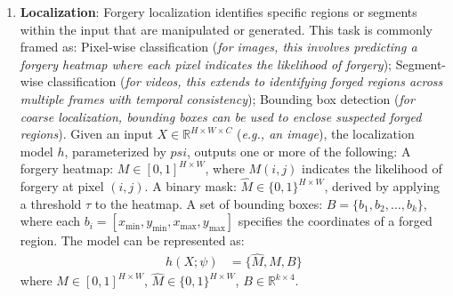 \begin{enumerate}
    \item \textbf{Localization}:
    Forgery localization identifies specific regions or segments within the input that are manipulated or generated. This task is commonly framed as: Pixel-wise classification (\textit{for images, this involves predicting a forgery heatmap where each pixel indicates the likelihood of forgery}); Segment-wise classification (\textit{for videos, this extends to identifying forged regions across multiple frames with temporal consistency}); Bounding box detection (\textit{for coarse localization, bounding boxes can be used to enclose suspected forged regions}). Given an input $X\in \mathbb{R}^{H \times W \times C}$ (\textit{e.g., an image}), the localization model $h$, parameterized by $psi$, outputs one or more of the following: A forgery heatmap: $M \in [0, 1]^{H \times W} $, where $M(i, j)$ indicates the likelihood of forgery at pixel $(i, j)$. A binary mask: $\hat{M} \in \{0, 1\}^{H \times W} $, derived by applying a threshold $\tau$ to the heatmap. A set of bounding boxes: $ B=\{b_1, b_2, \dots, b_k\} $, where each $b_i=[x_{\text{min}}, y_{\text{min}}, x_{\text{max}}, y_{\text{max}}]$ specifies the coordinates of a forged region. The model can be represented as: 
    \begin{equation}\label{eqn-3}
        \begin{aligned}
        h(X; \psi) &= \{ \hat{M}, M, B \}
        \end{aligned}
    \end{equation}
        where $M \in [0, 1]^{H \times W}$, $\hat{M} \in \{0, 1\}^{H \times W}$, $B \in \mathbb{R}^{k \times 4}$.
\end{enumerate}





